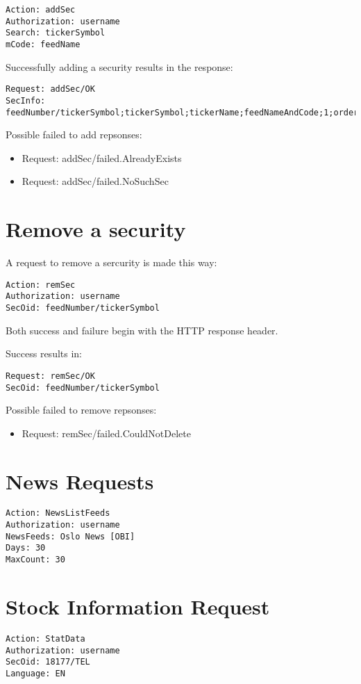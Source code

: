 \documentclass[12pt,twoside,letterpaper]{report}
\begin{document}
\begin{verbatim}
Action: addSec
Authorization: username
Search: tickerSymbol
mCode: feedName
\end{verbatim}

Successfully adding a security results in the response: 
\begin{lstlisting}
Request: addSec/OK
SecInfo: feedNumber/tickerSymbol;tickerSymbol;tickerName;feedNameAndCode;1;orderBook;ISIN;tickerExchangeCode
\end{lstlisting}

Possible failed to add repsonses:
\begin{itemize}
\item Request: addSec/failed.AlreadyExists
\item Request: addSec/failed.NoSuchSec
\end{itemize}

\section*{Remove a security}

A request to remove a sercurity is made this way:
\begin{verbatim}
Action: remSec
Authorization: username
SecOid: feedNumber/tickerSymbol
\end{verbatim}

Both success and failure begin with the HTTP response header.

Success results in:
\begin{verbatim}
Request: remSec/OK
SecOid: feedNumber/tickerSymbol
\end{verbatim}

Possible failed to remove repsonses:
\begin{itemize}
\item Request: remSec/failed.CouldNotDelete
\end{itemize}

\section*{News Requests}
\begin{verbatim}
Action: NewsListFeeds
Authorization: username
NewsFeeds: Oslo News [OBI]
Days: 30
MaxCount: 30
\end{verbatim}

\section*{Stock Information Request}
\begin{verbatim}
Action: StatData
Authorization: username
SecOid: 18177/TEL
Language: EN
\end{verbatim}
\end{document}

